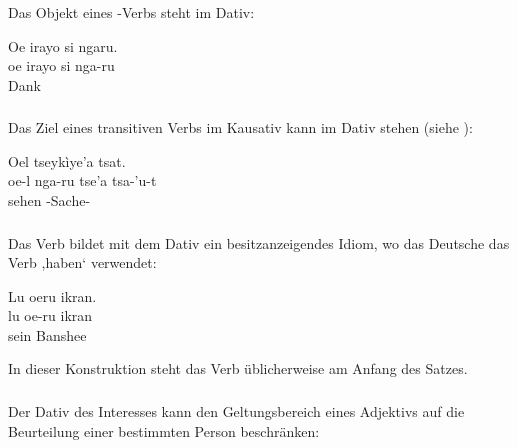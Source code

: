 \subsubsection{} Das Objekt eines -Verbs steht im Dativ:\label{syn:case:dative-si}

\begin{interlin}
	\glll Oe irayo si ngaru. \\
	oe irayo si nga-ru \\
	 Dank   \\
\end{interlin}

\subsubsection{} Das Ziel eines transitiven Verbs im Kausativ kann im Dativ stehen (siehe ):

\begin{interlin}
	\glll Oel  tseykìye'a tsat. \\
	oe-l nga-ru tse'a tsa-'u-t \\
	  sehen -Sache- \\
\end{interlin}

\subsubsection{} Das Verb  bildet mit dem Dativ ein besitzanzeigendes Idiom, wo das Deutsche das Verb ,haben‘ verwendet:

\begin{interlin}
	\glll Lu oeru ikran. \\
	lu oe-ru ikran \\
	sein  Banshee \\
\end{interlin}

In dieser Konstruktion steht das Verb üblicherweise am Anfang des Satzes. 

\subsubsection{} Der Dativ des Interesses kann den Geltungsbereich eines Adjektivs auf die Beurteilung  einer bestimmten Person beschränken:

